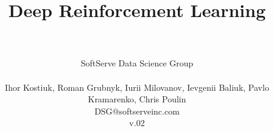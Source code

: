 \begin{titlepage}

\title{Deep Reinforcement Learning}
\author{
\\\\SoftServe Data Science Group\\\\
{\small {Ihor Kostiuk, Roman Grubnyk, Iurii Milovanov, Ievgenii Baliuk, Pavlo Kramarenko, Chris Poulin}}\\
{\small {DSG\makeatletter @\makeatother softserveinc.com}}\\
{\small {v.02}}
\\\\
}
\date{}
\clearpage\maketitle
\thispagestyle{empty}

\end{titlepage}
